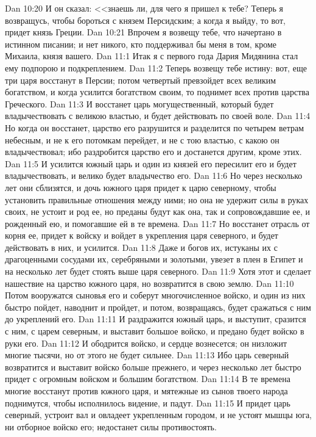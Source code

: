 \vs Dan 10:20 И он сказал: <<знаешь ли, для чего я пришел к тебе? Теперь я возвращусь, чтобы бороться с князем Персидским; а когда я выйду, то вот, придет князь Греции.
\vs Dan 10:21 Впрочем я возвещу тебе, что начертано в истинном писании; и нет никого, кто поддерживал бы меня в том, кроме Михаила, князя вашего.
\vs Dan 11:1 Итак я с первого года Дария Мидянина стал ему подпорою и подкреплением.
\vs Dan 11:2 Теперь возвещу тебе истину: вот, еще три царя восстанут в Персии; потом четвертый превзойдет всех великим богатством, и когда усилится богатством своим, то поднимет всех против царства Греческого.
\vs Dan 11:3 И восстанет царь могущественный, который будет владычествовать с великою властью, и будет действовать по своей воле.
\vs Dan 11:4 Но когда он восстанет, царство его разрушится и разделится по четырем ветрам небесным, и не к его потомкам перейдет, и не с тою властью, с какою он владычествовал; ибо раздробится царство его и достанется другим, кроме этих.
\vs Dan 11:5 И усилится южный царь и один из князей его пересилит его и будет владычествовать, и велико будет владычество его.
\vs Dan 11:6 Но через несколько лет они сблизятся, и дочь южного царя придет к царю северному, чтобы установить правильные отношения между ними; но она не удержит силы в руках своих, не устоит и род ее, но преданы будут как она, так и сопровождавшие ее, и рожденный ею, и помогавшие ей в те времена.
\vs Dan 11:7 Но восстанет отрасль от корня ее, придет к войску и войдет в укрепления царя северного, и будет действовать в них, и усилится.
\vs Dan 11:8 Даже и богов их, истуканы их с драгоценными сосудами их, серебряными и золотыми, увезет в плен в Египет и на несколько лет будет стоять выше царя северного.
\vs Dan 11:9 Хотя этот и сделает нашествие на царство южного царя, но возвратится в свою землю.
\vs Dan 11:10 Потом вооружатся сыновья его и соберут многочисленное войско, и один из них быстро пойдет, наводнит и пройдет, и потом, возвращаясь, будет сражаться с ним до укреплений его.
\vs Dan 11:11 И раздражится южный царь, и выступит, сразится с ним, с царем северным, и выставит большое войско, и предано будет войско в руки его.
\vs Dan 11:12 И ободрится войско, и сердце  вознесется; он низложит многие тысячи, но от этого не будет сильнее.
\vs Dan 11:13 Ибо царь северный возвратится и выставит войско больше прежнего, и через несколько лет быстро придет с огромным войском и большим богатством.
\vs Dan 11:14 В те времена многие восстанут против южного царя, и мятежные из сынов твоего народа поднимутся, чтобы исполнилось видение, и падут.
\vs Dan 11:15 И придет царь северный, устроит вал и овладеет укрепленным городом, и не устоят мышцы юга, ни отборное войско его; недостанет силы противостоять.
